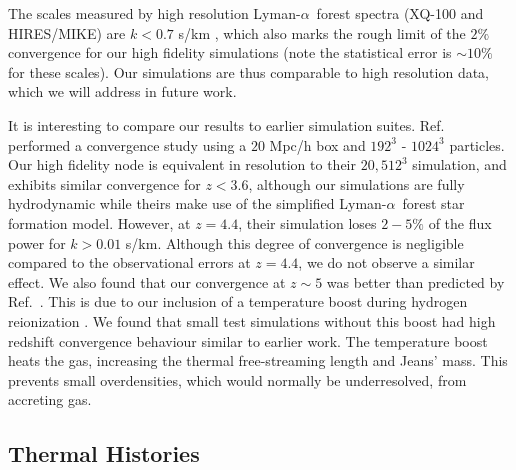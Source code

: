 \documentclass[a4paper,11pt]{article}
\newcommand{\spb}[1]{{\textcolor{magenta}{[{\bf SPB}: #1]}}}
\newcommand{\Lya}{Lyman-$\alpha$}
\begin{document}
The scales measured by high resolution \Lya~forest spectra (XQ-100 and HIRES/MIKE) are $ k < 0.7$ s/km \cite{Irsic:2017}, which also marks the rough limit of the $2\%$ convergence for our high fidelity simulations (note the statistical error is $\sim 10\%$ for these scales). Our simulations are thus comparable to high resolution data, which we will address in future work.

It is interesting to compare our results to earlier simulation suites. Ref.~\cite{Borde:2014} performed a convergence study using a $20$ Mpc/h box and $192^3$ - $1024^3$ particles. Our high fidelity node is equivalent in resolution to their $20, 512^3$ simulation, and exhibits similar convergence for $z < 3.6$, although our simulations are fully hydrodynamic while theirs make use of the simplified \Lya~forest star formation model. However, at $z=4.4$, their simulation loses $2-5\%$ of the flux power for $k > 0.01$ s/km. Although this degree of convergence is negligible compared to the observational errors at $z=4.4$, we do not observe a similar effect.
We also found that our convergence at $z \sim 5$ was better than predicted by Ref.~\cite{2009MNRAS.398L..26B}. This is due to our inclusion of a temperature boost during hydrogen reionization \cite{DAloisio:2019}. We found that small test simulations without this boost had high redshift convergence behaviour similar to earlier work. The temperature boost heats the gas, increasing the thermal free-streaming length and Jeans' mass. This prevents small overdensities, which would normally be underresolved, from accreting gas.



\subsection{Thermal Histories}
\end{document}
